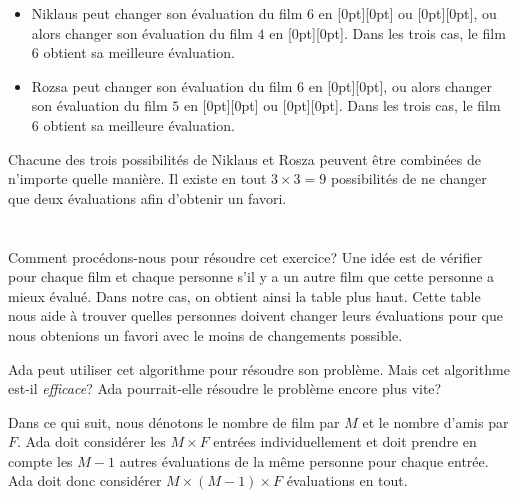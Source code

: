 {{\begin{itemize}
  \item Niklaus peut changer son évaluation du film $6$ en \raisebox{-0.5ex}[0pt][0pt]{} ou \raisebox{-0.5ex}[0pt][0pt]{}, ou alors changer son évaluation du film $4$ en \raisebox{-0.5ex}[0pt][0pt]{}. Dans les trois cas, le film $6$ obtient sa meilleure évaluation.
  \item Rozsa peut changer son évaluation du film $6$ en \raisebox{-0.5ex}[0pt][0pt]{}, ou alors changer son évaluation du film $5$ en \raisebox{-0.5ex}[0pt][0pt]{} ou \raisebox{-0.5ex}[0pt][0pt]{}. Dans les trois cas, le film $6$ obtient sa meilleure évaluation.
\end{itemize}

Chacune des trois possibilités de Niklaus et Rosza peuvent être combinées de n’importe quelle manière. Il existe en tout ${3 \times 3 = 9}$ possibilités de ne changer que deux évaluations afin d’obtenir un favori.



\section*{\BrochureItsInformatics}
Comment procédons-nous pour résoudre cet exercice? Une idée est de vérifier pour chaque film et chaque personne s’il y a un autre film que cette personne a mieux évalué. Dans notre cas, on obtient ainsi la table plus haut. Cette table nous aide à trouver quelles personnes doivent changer leurs évaluations pour que nous obtenions un favori avec le moins de changements possible.

Ada peut utiliser cet algorithme pour résoudre son problème. Mais cet algorithme est-il \emph{efficace}? Ada pourrait-elle résoudre le problème encore plus vite?

Dans ce qui suit, nous dénotons le nombre de film par ${M}$ et le nombre d’amis par ${F}$. Ada doit considérer les ${M \times F}$ entrées individuellement et doit prendre en compte les ${M-1}$ autres évaluations de la même personne pour chaque entrée. Ada doit donc considérer ${M \times (M-1) \times F}$ évaluations en tout.

}}
